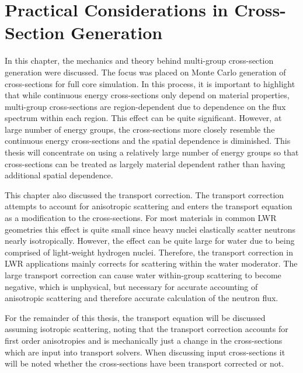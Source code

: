 \section{Practical Considerations in Cross-Section Generation}
\label{sec:mgxs-implications}

In this chapter, the mechanics and theory behind multi-group cross-section generation were discussed. The focus was placed on Monte Carlo generation of cross-sections for full core simulation. In this process, it is important to highlight that while continuous energy cross-sections only depend on material properties, multi-group cross-sections are region-dependent due to dependence on the flux spectrum within each region. This effect can be quite significant. However, at large number of energy groups, the cross-sections more closely resemble the continuous energy cross-sections and the spatial dependence is diminished. This thesis will concentrate on using a relatively large number of energy groups so that cross-sections can be treated as largely material dependent rather than having additional spatial dependence.

This chapter also discussed the transport correction. The transport correction attempts to account for anisotropic scattering and enters the transport equation as a modification to the cross-sections. For most materials in common LWR geometries this effect is quite small since heavy nuclei elastically scatter neutrons nearly isotropically. However, the effect can be quite large for water due to being comprised of light-weight hydrogen nuclei. Therefore, the transport correction in LWR applications mainly corrects for scattering within the water moderator. The large transport correction can cause water within-group scattering to become negative, which is unphysical, but necessary for accurate accounting of anisotropic scattering and therefore accurate calculation of the neutron flux.

For the remainder of this thesis, the transport equation will be discussed assuming isotropic scattering, noting that the transport correction accounts for first order anisotropies and is mechanically just a change in the cross-sections which are input into transport solvers. When discussing input cross-sections it will be noted whether the cross-sections have been transport corrected or not.

